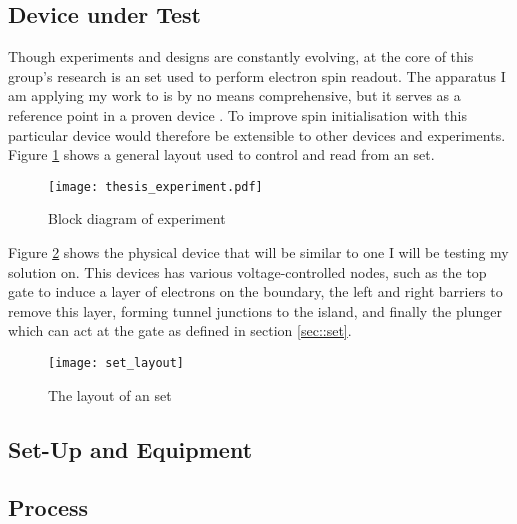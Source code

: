 \label{sec::real-time}
\subsection{Device under Test}
\label{sec::experiment}
Though experiments and designs are constantly evolving, at the core of this group's research is an \gls{set} used to perform electron spin readout. The apparatus I am applying my work to is by no means comprehensive, but it serves as a reference point in a proven device \cite{morello2010single}. To improve spin initialisation with this particular device would therefore be extensible to other devices and experiments.
Figure \ref{fig::thesis_experiment} shows a general layout used to control and read from an \gls{set}.

\begin{figure}[htbp!]
	\centering
	\texttt{[image: thesis\_experiment.pdf]}
	\caption{Block diagram of experiment}
	\label{fig::thesis_experiment}
\end{figure}


Figure \ref{fig::set_layout} shows the physical device that will be similar to one I will be testing my solution on. This devices has various voltage-controlled nodes, such as the top gate to induce a layer of electrons on the boundary, the left and right barriers to remove this layer, forming tunnel junctions to the island, and finally the plunger which can act at the gate as defined in section \ref{sec::set}.

\begin{figure}[htbp!]
	\centering
	\texttt{[image: set\_layout]}
	\caption[Layout of an \gls{set}]{The layout of an \gls{set}\cite{morello2010single}}
	\label{fig::set_layout}
\end{figure}

\subsection{Set-Up and Equipment}

\subsection{Process}

